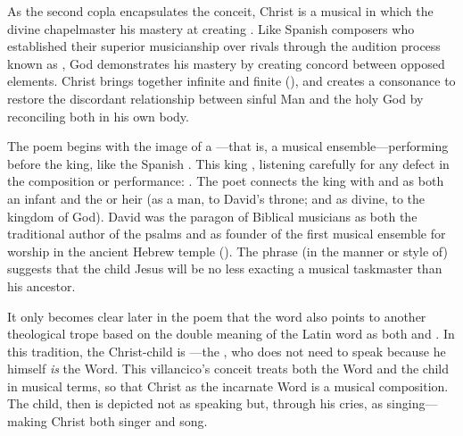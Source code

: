 As the second copla encapsulates the conceit, Christ is a musical
 in which the divine chapelmaster  his
mastery at creating .
Like Spanish composers who established their superior musicianship over rivals
through the audition process known as , God demonstrates his
mastery by creating concord between opposed elements.
Christ brings together infinite and finite (), and
creates a consonance to restore the discordant relationship between sinful Man
and the holy God by reconciling both in his own body.

The poem begins with the image of a ---that is, a musical
ensemble---performing before the king, like the Spanish .
This king , listening carefully for any defect in the
composition or performance: .
The poet connects the king with  and 
as both an infant and the  or heir (as a man, to David's throne;
and as divine, to the kingdom of God).
David was the paragon of Biblical musicians as both the traditional author of
the psalms and as founder of the first musical ensemble for worship in the
ancient Hebrew temple ().
The phrase  (in the manner or style of) suggests that the
child Jesus will be no less exacting a musical taskmaster than his ancestor.

It only becomes clear later in the poem that the word  also
points to another theological trope based on the double meaning of the Latin
word  as both  and .
In this tradition, the Christ-child is ---the
, who does not need to speak because he himself
\emph{is} the Word.
This villancico's conceit treats both the Word and the child in musical terms,
so that Christ as the incarnate Word is a musical composition.
The child, then is depicted not as speaking but, through his cries, as
singing---making Christ both singer and song.

